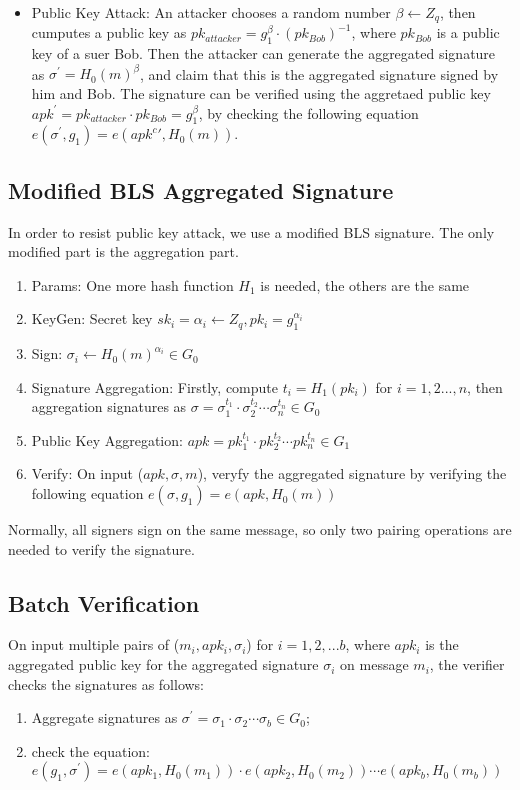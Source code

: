 \documentclass[12pt]{report}
\begin{document}
\begin{itemize}
	\item{Public Key Attack:} An attacker chooses a random number $\beta \leftarrow Z_{q}$, then cumputes a public key as $pk_{attacker}=g_{1}^{\beta}\cdot (pk_{Bob})^{-1}$, where $pk_{Bob}$ is a public key of a suer Bob. Then the attacker can generate the aggregated signature as $\sigma^{'}=H_{0}(m)^{\beta}$, and claim that this is the aggregated signature signed by him and Bob. The signature can be verified using the aggretaed public key $apk^{'}=pk_{attacker} \cdot pk_{Bob}=g_{1}^\beta$, by checking the following equation $e(\sigma^{'}, g_{1})=e(apk^c{'},H_{0}(m))$. 
\end{itemize}

\subsection{Modified BLS Aggregated Signature}
In order to resist public key attack, we use a modified BLS signature. The only modified part is the aggregation part.
\begin{enumerate}
	\item{Params:} One more hash function $H_{1}$ is needed, the others are the same
	\item{KeyGen:} Secret key $sk_{i}=\alpha_{i}\leftarrow Z_{q}, pk_{i}=g_{1}^{\alpha_{i}}$
	\item{Sign:} $\sigma_{i} \leftarrow H_{0}(m)^{\alpha_{i}} \in G_{0}$
	\item{Signature Aggregation:} Firstly, compute $t_{i}=H_{1}(pk_{i})$ for $i=1,2...,n$, then aggregation signatures as $\sigma=\sigma_{1}^{t_1} \cdot \sigma_{2}^{t_2} \cdots \sigma_{n}^{t_n} \in G_{0}$
	\item{Public Key Aggregation:} $apk=pk_{1}^{t_1} \cdot pk_{2}^{t_2} \cdots pk_{n}^{t_n} \in G_{1}$
	\item{Verify:} On input ($apk,\sigma, m$), veryfy the aggregated signature by verifying the following equation $e(\sigma, g_{1})=e(apk,H_{0}(m))$
\end{enumerate}
Normally, all signers sign on the same message, so only two pairing operations are needed to verify the signature.

\subsection{Batch Verification}
On input multiple pairs of ($m_{i},apk_{i},\sigma_{i}$) for $i=1,2,...b$, where $apk_{i}$ is the aggregated public key for the aggregated signature $\sigma_{i}$ on message $m_{i}$, the verifier checks the signatures as follows:
\begin{enumerate}
	\item Aggregate signatures as $\sigma^{'}=\sigma_{1} \cdot \sigma_{2} \cdots \sigma_{b} \in G_{0}$;
	\item check the equation: $e(g_{1}, \sigma^{'})=e(apk_{1},H_{0}(m_{1}))\cdot e(apk_{2}, H_{0}(m_{2})) \cdots e(apk_{b}, H_{0}(m_{b}))$
\end{enumerate}
\end{document}
